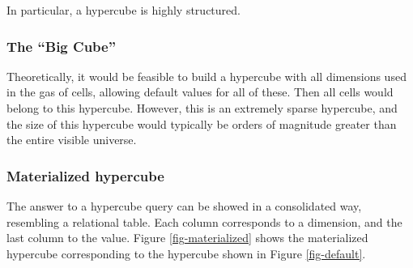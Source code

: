 \documentclass{vldb}
\begin{document}
In particular, a hypercube is highly structured.

\subsubsection{The ``Big Cube''}
Theoretically, it would be feasible to build a hypercube with all dimensions used in the gas of cells, allowing default values for all of these. Then all cells would belong to this hypercube. However, this is an extremely sparse hypercube, and the size of this hypercube would typically be orders of magnitude greater than the entire visible universe.

\subsubsection{Materialized hypercube}

The answer to a hypercube query can be showed in a consolidated way, resembling a relational table. Each column corresponds to a dimension, and the last column to the value. Figure \ref{fig-materialized} shows the materialized hypercube corresponding to the hypercube shown in Figure \ref{fig-default}.
\end{document}
